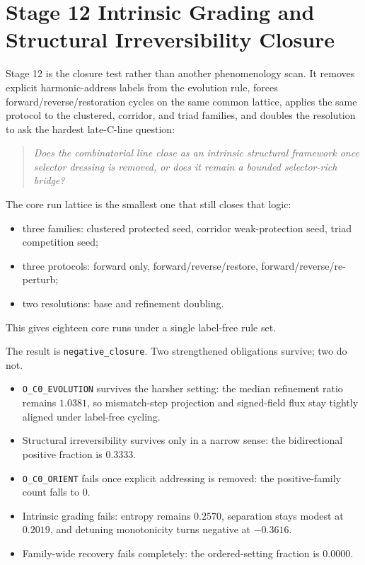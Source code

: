 \documentclass[11pt]{article}
\begin{document}
\section{Stage 12 Intrinsic Grading and Structural Irreversibility Closure}

Stage 12 is the closure test rather than another phenomenology scan. It removes explicit harmonic-address labels from the evolution rule, forces forward/reverse/restoration cycles on the same common lattice, applies the same protocol to the clustered, corridor, and triad families, and doubles the resolution to ask the hardest late-C-line question:
\begin{quote}
\emph{Does the combinatorial line close as an intrinsic structural framework once selector dressing is removed, or does it remain a bounded selector-rich bridge?}
\end{quote}

The core run lattice is the smallest one that still closes that logic:
\begin{itemize}
\item three families: clustered protected seed, corridor weak-protection seed, triad competition seed;
\item three protocols: forward only, forward/reverse/restore, forward/reverse/re-perturb;
\item two resolutions: base and refinement doubling.
\end{itemize}
This gives eighteen core runs under a single label-free rule set.

The result is \texttt{negative\_closure}. Two strengthened obligations survive; two do not.
\begin{itemize}
\item \texttt{O\_C0\_EVOLUTION} survives the harsher setting: the median refinement ratio remains $1.0381$, so mismatch-step projection and signed-field flux stay tightly aligned under label-free cycling.
\item Structural irreversibility survives only in a narrow sense: the bidirectional positive fraction is $0.3333$.
\item \texttt{O\_C0\_ORIENT} fails once explicit addressing is removed: the positive-family count falls to $0$.
\item Intrinsic grading fails: entropy remains $0.2570$, separation stays modest at $0.2019$, and detuning monotonicity turns negative at $-0.3616$.
\item Family-wide recovery fails completely: the ordered-setting fraction is $0.0000$.
\end{itemize}
\end{document}
